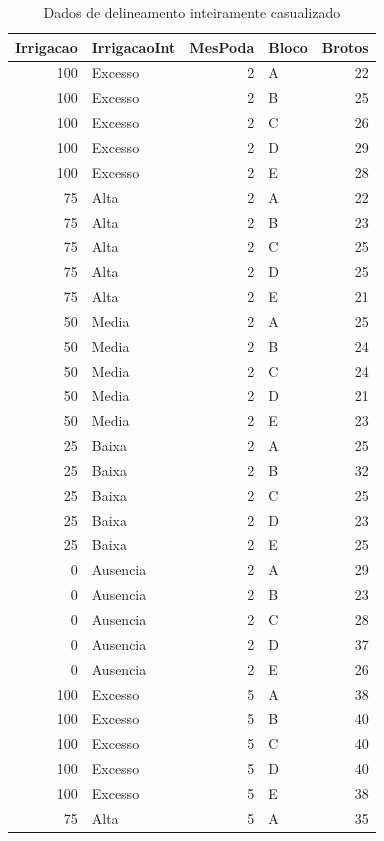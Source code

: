 \documentclass[
]{article}
\begin{document}
\begin{table}

\caption{\label{tab:unnamed-chunk-46}Dados de delineamento inteiramente casualizado}
\centering
\begin{tabular}[t]{r|l|r|l|r}
\hline
Irrigacao & IrrigacaoInt & MesPoda & Bloco & Brotos\\
\hline
100 & Excesso & 2 & A & 22\\
\hline
100 & Excesso & 2 & B & 25\\
\hline
100 & Excesso & 2 & C & 26\\
\hline
100 & Excesso & 2 & D & 29\\
\hline
100 & Excesso & 2 & E & 28\\
\hline
75 & Alta & 2 & A & 22\\
\hline
75 & Alta & 2 & B & 23\\
\hline
75 & Alta & 2 & C & 25\\
\hline
75 & Alta & 2 & D & 25\\
\hline
75 & Alta & 2 & E & 21\\
\hline
50 & Media & 2 & A & 25\\
\hline
50 & Media & 2 & B & 24\\
\hline
50 & Media & 2 & C & 24\\
\hline
50 & Media & 2 & D & 21\\
\hline
50 & Media & 2 & E & 23\\
\hline
25 & Baixa & 2 & A & 25\\
\hline
25 & Baixa & 2 & B & 32\\
\hline
25 & Baixa & 2 & C & 25\\
\hline
25 & Baixa & 2 & D & 23\\
\hline
25 & Baixa & 2 & E & 25\\
\hline
0 & Ausencia & 2 & A & 29\\
\hline
0 & Ausencia & 2 & B & 23\\
\hline
0 & Ausencia & 2 & C & 28\\
\hline
0 & Ausencia & 2 & D & 37\\
\hline
0 & Ausencia & 2 & E & 26\\
\hline
100 & Excesso & 5 & A & 38\\
\hline
100 & Excesso & 5 & B & 40\\
\hline
100 & Excesso & 5 & C & 40\\
\hline
100 & Excesso & 5 & D & 40\\
\hline
100 & Excesso & 5 & E & 38\\
\hline
75 & Alta & 5 & A & 35\\

\end{tabular}
\end{table}
\end{document}
